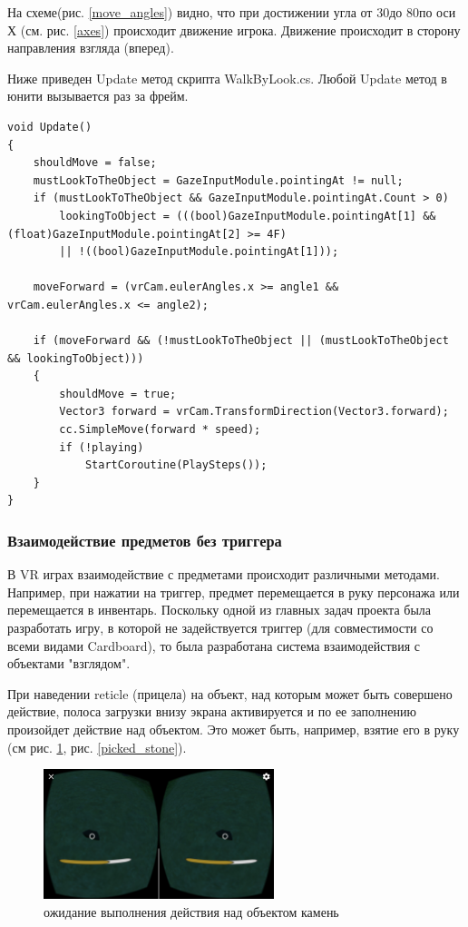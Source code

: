 На схеме(рис. \ref{move_angles}) видно, что при достижении угла от 30\degr до 80\degr по оси Х (см. 
рис. \ref{axes})
происходит движение игрока. Движение происходит в сторону направления взгляда 
(вперед).

Ниже приведен Update метод скрипта WalkByLook.cs. Любой Update метод в юнити вызывается раз за фрейм.

\begin{small}
	\begin{verbatim}
void Update()
{
    shouldMove = false;
    mustLookToTheObject = GazeInputModule.pointingAt != null;
    if (mustLookToTheObject && GazeInputModule.pointingAt.Count > 0)
        lookingToObject = (((bool)GazeInputModule.pointingAt[1] && 	(float)GazeInputModule.pointingAt[2] >= 4F)
        || !((bool)GazeInputModule.pointingAt[1]));

    moveForward = (vrCam.eulerAngles.x >= angle1 && vrCam.eulerAngles.x <= angle2);

    if (moveForward && (!mustLookToTheObject || (mustLookToTheObject && lookingToObject)))
    {
        shouldMove = true;
        Vector3 forward = vrCam.TransformDirection(Vector3.forward);
        cc.SimpleMove(forward * speed);
        if (!playing)
            StartCoroutine(PlaySteps());
    }
}
	\end{verbatim}
\end{small}


\subsubsection{Взаимодействие предметов без триггера}

\tab[0.75cm]В VR играх взаимодействие с предметами происходит различными методами. Например, при нажатии на триггер, предмет перемещается в руку персонажа или перемещается в инвентарь. Поскольку одной из главных задач проекта была разработать игру, в которой не 
задействуется триггер (для совместимости со всеми видами Cardboard), то была 
разработана система взаимодействия с объектами "взглядом".

При наведении reticle (прицела) на объект, над которым может быть совершено действие, полоса загрузки внизу экрана активируется и по ее заполнению произойдет действие над объектом. Это может быть, например, взятие его в руку (см рис. \ref{pick_stone}, рис. \ref{picked_stone}).

\begin{figure}[h!]
	\centering
	\includegraphics[width=0.6\textwidth]{./screenshots/pick_stone1.jpg}
	\caption{\small{ожидание выполнения действия над объектом камень}}
	\label{pick_stone}
\end{figure} 

